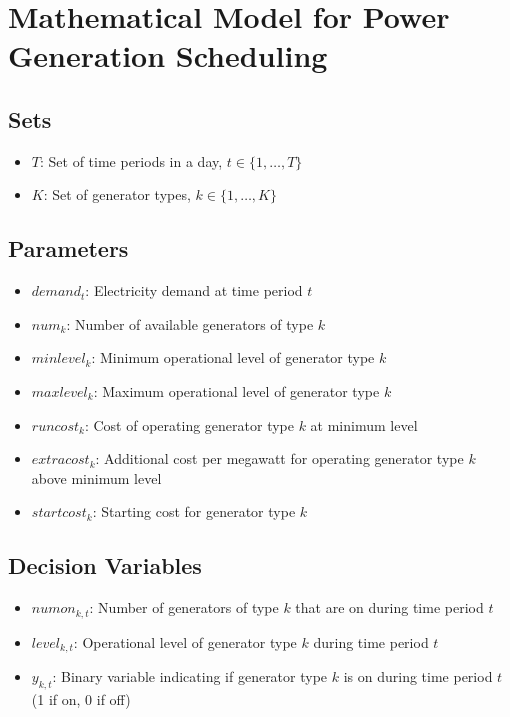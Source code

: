 \documentclass{article}
\begin{document}
\section*{Mathematical Model for Power Generation Scheduling}

\subsection*{Sets}
\begin{itemize}
    \item $T$: Set of time periods in a day, $t \in \{1, \ldots, T\}$
    \item $K$: Set of generator types, $k \in \{1, \ldots, K\}$
\end{itemize}

\subsection*{Parameters}
\begin{itemize}
    \item $demand_{t}$: Electricity demand at time period $t$ 
    \item $num_{k}$: Number of available generators of type $k$
    \item $minlevel_{k}$: Minimum operational level of generator type $k$
    \item $maxlevel_{k}$: Maximum operational level of generator type $k$
    \item $runcost_{k}$: Cost of operating generator type $k$ at minimum level
    \item $extracost_{k}$: Additional cost per megawatt for operating generator type $k$ above minimum level
    \item $startcost_{k}$: Starting cost for generator type $k$
\end{itemize}

\subsection*{Decision Variables}
\begin{itemize}
    \item $numon_{k,t}$: Number of generators of type $k$ that are on during time period $t$
    \item $level_{k,t}$: Operational level of generator type $k$ during time period $t$
    \item $y_{k,t}$: Binary variable indicating if generator type $k$ is on during time period $t$ (1 if on, 0 if off)
\end{itemize}
\end{document}
